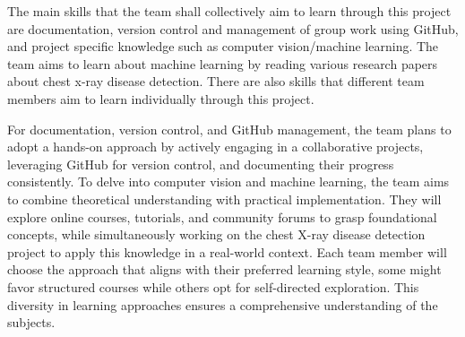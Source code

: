 \documentclass[12pt]{article}
\begin{document}
The main skills that the team shall collectively aim to learn through this project are documentation, version control and management of group work using GitHub, and project specific knowledge such as computer vision/machine learning. The team aims to learn about machine learning by reading various research papers about chest x-ray disease detection. There are also skills that different team members aim to learn individually through this project.

For documentation, version control, and GitHub management, the team plans to adopt a hands-on approach by actively engaging in a collaborative projects, leveraging GitHub for version control, and documenting their progress consistently. To delve into computer vision and machine learning, the team aims to combine theoretical understanding with practical implementation. They will explore online courses, tutorials, and community forums to grasp foundational concepts, while simultaneously working on the chest X-ray disease detection project to apply this knowledge in a real-world context. Each team member will choose the approach that aligns with their preferred learning style, some might favor structured courses while others opt for self-directed exploration. This diversity in learning approaches ensures a comprehensive understanding of the subjects. 
\end{document}
